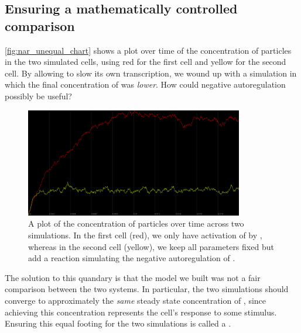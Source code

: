 \begin{note}\end{note}

\FloatBarrier
{}
\subsection{Ensuring a mathematically controlled comparison}

\autoref{fig:nar_unequal_chart} shows a plot over time of the concentration of  particles in the two simulated cells, using red for the first cell and yellow for the second cell. By allowing  to slow its own transcription, we wound up with a simulation in which the final concentration of  was \textit{lower}. How could negative autoregulation possibly be useful?

\begin{figure}[h]
\centering
\mySfFamily
\includegraphics[width = 0.85\textwidth]{../images/cellblender_nar_unequal_chart.png}
\caption{A plot of the concentration of  particles over time across two simulations. In the first cell (red), we only have activation of  by , whereas in the second cell (yellow), we keep all parameters fixed but add a reaction simulating the negative autoregulation of .}
\label{fig:nar_unequal_chart}
\end{figure}

The solution to this quandary is that the model we built was not a fair comparison between the two systems. In particular, the two simulations should converge to approximately the \textit{same} steady state concentration of , since achieving this concentration represents the cell's response to some stimulus. Ensuring this equal footing for the two simulations is called a .\\

